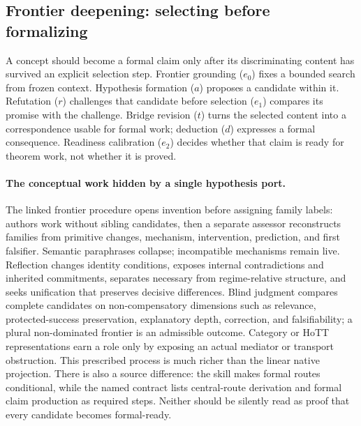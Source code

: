 

\subsection{Frontier deepening: selecting before formalizing}
\label{app:granular-conceptual-frontier-deepening}
A concept should become a formal claim only after its discriminating content has
survived an explicit selection step. Frontier grounding ($e_0$) fixes a bounded
search from frozen context. Hypothesis formation ($a$) proposes a candidate
within it. Refutation ($r$) challenges that candidate before selection ($e_1$)
compares its promise with the challenge. Bridge revision ($t$) turns the selected
content into a correspondence usable for formal work; deduction ($d$) expresses
a formal consequence. Readiness calibration ($e_2$) decides whether that claim
is ready for theorem work, not whether it is proved.

\paragraph{The conceptual work hidden by a single hypothesis port.}
The linked frontier procedure opens invention before assigning family labels:
authors work without sibling candidates, then a separate assessor reconstructs
families from primitive changes, mechanism, intervention, prediction, and first
falsifier. Semantic paraphrases collapse; incompatible mechanisms remain live.
Reflection changes identity conditions, exposes internal contradictions and
inherited commitments, separates necessary from regime-relative structure, and
seeks unification that preserves decisive differences. Blind judgment compares
complete candidates on non-compensatory dimensions such as relevance,
protected-success preservation, explanatory depth, correction, and falsifiability;
a plural non-dominated frontier is an admissible outcome. Category or HoTT
representations earn a role only by exposing an actual mediator or transport
obstruction. This prescribed process is much richer than the linear native
projection. There is also a source difference: the skill makes formal routes
conditional, while the named contract lists central-route derivation and formal
claim production as required steps. Neither should be silently read as proof
that every candidate becomes formal-ready.


